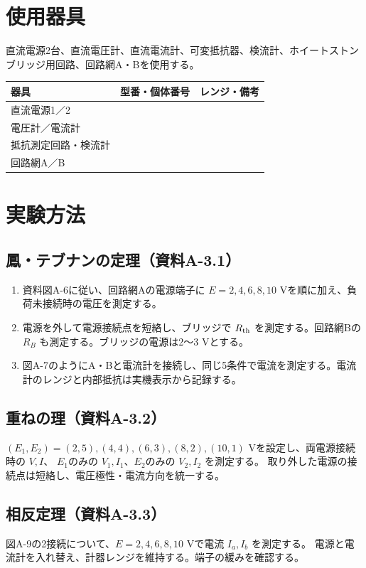 \documentclass[lualatex,a4paper,10pt]{jlreq}
\begin{document}
\section{使用器具}\label{sec:auto3}
直流電源2台、直流電圧計、直流電流計、可変抵抗器、検流計、ホイートストンブリッジ用回路、回路網A・Bを使用する。
\par\noindent\begin{tabularx}{\linewidth}{YYY}\toprule 器具 & 型番・個体番号 & レンジ・備考\\\midrule
直流電源1／2&&\\電圧計／電流計&&\\抵抗測定回路・検流計&&\\回路網A／B&&\\\bottomrule\end{tabularx}
\clearpage
\section{実験方法}\label{sec:auto4}
\subsection{鳳・テブナンの定理（資料A-3.1）}
\begin{enumerate}
\item 資料図A-6に従い、回路網Aの電源端子に $E=2,4,6,8,10$ Vを順に加え、負荷未接続時の電圧を測定する。
\item 電源を外して電源接続点を短絡し、ブリッジで $R_{\rm th}$ を測定する。回路網Bの $R_B$ も測定する。ブリッジの電源は2〜3 Vとする。
\item 図A-7のようにA・Bと電流計を接続し、同じ5条件で電流を測定する。電流計のレンジと内部抵抗は実機表示から記録する。
\end{enumerate}
\subsection{重ねの理（資料A-3.2）}
$(E_1,E_2)=(2,5),(4,4),(6,3),(8,2),(10,1)$ Vを設定し、両電源接続時の $V,I$、
$E_1$のみの $V_1,I_1$、$E_2$のみの $V_2,I_2$ を測定する。
取り外した電源の接続点は短絡し、電圧極性・電流方向を統一する。
\subsection{相反定理（資料A-3.3）}
図A-9の2接続について、$E=2,4,6,8,10$ Vで電流 $I_a,I_b$ を測定する。
電源と電流計を入れ替え、計器レンジを維持する。端子の緩みを確認する。
\end{document}
